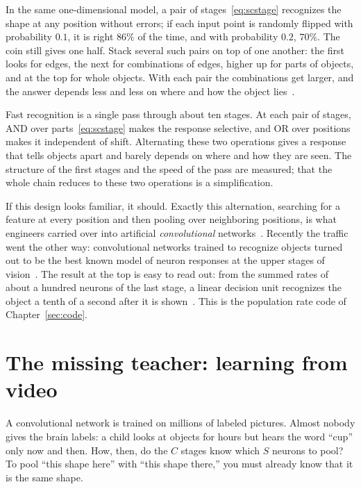 In the same one-dimensional model, a pair of stages~\eqref{eq:scstage} recognizes the shape at any position without errors; if each input point is randomly flipped with probability $0.1$, it is right $86\%$ of the time, and with probability $0.2$, $70\%$. The coin still gives one half. Stack several such pairs on top of one another: the first looks for edges, the next for combinations of edges, higher up for parts of objects, and at the top for whole objects. With each pair the combinations get larger, and the answer depends less and less on where and how the object lies~\cite{Riesenhuber1999}.

\begin{keyblock}
\begin{proposition}
\label{prop:conveyor}
Fast recognition is a single pass through about ten stages. At each pair of stages, AND over parts~\eqref{eq:scstage} makes the response selective, and OR over positions makes it independent of shift. Alternating these two operations gives a response that tells objects apart and barely depends on where and how they are seen. The structure of the first stages and the speed of the pass are measured; that the whole chain reduces to these two operations is a simplification.
\end{proposition}
\end{keyblock}

If this design looks familiar, it should. Exactly this alternation, searching for a feature at every position and then pooling over neighboring positions, is what engineers carried over into artificial \emph{convolutional} networks~\cite{Fukushima1980}. Recently the traffic went the other way: convolutional networks trained to recognize objects turned out to be the best known model of neuron responses at the upper stages of vision~\cite{Yamins2014}. The result at the top is easy to read out: from the summed rates of about a hundred neurons of the last stage, a linear decision unit recognizes the object a tenth of a second after it is shown~\cite{Hung2005}. This is the population rate code of Chapter~\ref{sec:code}.

\section{The missing teacher: learning from video}

A convolutional network is trained on millions of labeled pictures. Almost nobody gives the brain labels: a child looks at objects for hours but hears the word ``cup'' only now and then. How, then, do the $C$ stages know which $S$ neurons to pool? To pool ``this shape here'' with ``this shape there,'' you must already know that it is the same shape.


